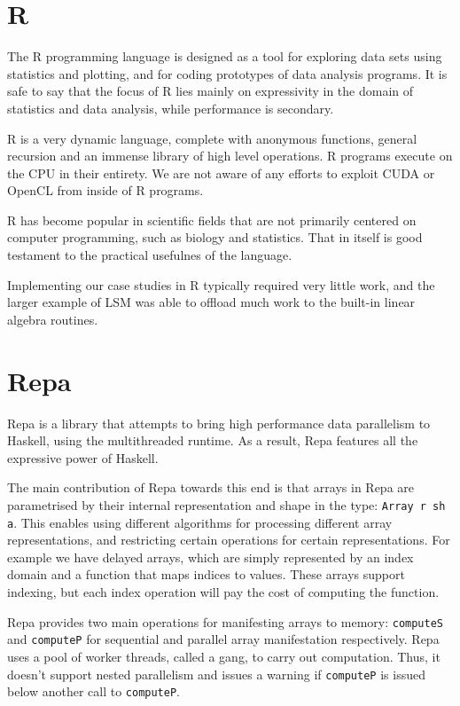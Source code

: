 \section{R}

The R programming language is designed as a tool for exploring data sets using
statistics and plotting, and for coding prototypes of data analysis programs.
It is safe to say that the focus of R lies mainly on expressivity in the domain
of statistics and data analysis, while performance is secondary.

R is a very dynamic language, complete with anonymous functions, general
recursion and an immense library of high level operations. R programs execute
on the CPU in their entirety. We are not aware of any efforts to exploit CUDA
or OpenCL from inside of R programs.

R has become popular in scientific fields that are not primarily
centered on computer programming, such as biology and
statistics. That in itself is good testament to the practical
usefulnes of the language.

Implementing our case studies in R typically required very little work, and the
larger example of LSM was able to offload much work to the built-in linear
algebra routines.

\section{Repa}

Repa is a library that attempts to bring high performance data parallelism to
Haskell, using the multithreaded runtime. As a result, Repa features all the
expressive power of Haskell.

The main contribution of Repa towards this end is that arrays in Repa are
parametrised by their internal representation and shape in the type:
\texttt{Array r sh a}.  This enables using different algorithms for processing
different array representations, and restricting certain operations for certain
representations. For example we have delayed arrays, which are simply
represented by an index domain and a function that maps indices to values.
These arrays support indexing, but each index operation will pay the cost of
computing the function.

Repa provides two main operations for manifesting arrays to memory:
\texttt{computeS} and \texttt{computeP} for sequential and parallel
array manifestation respectively. Repa uses a pool of worker threads,
called a gang, to carry out computation. Thus, it doesn't support
nested parallelism and issues a warning if \texttt{computeP} is issued
below another call to \texttt{computeP}.


